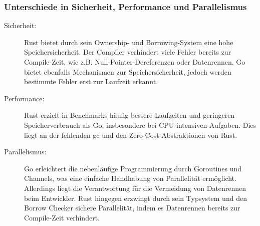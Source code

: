 \subsubsection{Unterschiede in Sicherheit, Performance und Parallelismus}
\begin{description}
    \item[Sicherheit:] Rust bietet durch sein Ownership- und Borrowing-System eine hohe Speichersicherheit. Der Compiler verhindert viele Fehler bereits zur Compile-Zeit, wie z.B. Null-Pointer-Dereferenzen oder Datenrennen. Go bietet ebenfalls Mechanismen zur Speichersicherheit, jedoch werden bestimmte Fehler erst zur Laufzeit erkannt.
    \item [Performance:] Rust erzielt in Benchmarks häufig bessere Laufzeiten und geringeren Speicherverbrauch als Go, insbesondere bei CPU-intensiven Aufgaben. \cite{Proxify2021} Dies liegt an der fehlenden \ac{gc} und den Zero-Cost-Abstraktionen von Rust.\cite{Abhinav2025}
    \item[Parallelismus:] Go erleichtert die nebenläufige Programmierung durch Goroutines und Channels, was eine einfache Handhabung von Parallelität ermöglicht. \cite{dami2024} Allerdings liegt die Verantwortung für die Vermeidung von Datenrennen beim Entwickler. Rust hingegen erzwingt durch sein Typsystem und den Borrow Checker sichere Parallelität, indem es Datenrennen bereits zur Compile-Zeit verhindert. \cite{Obregon2023}
\end{description}
